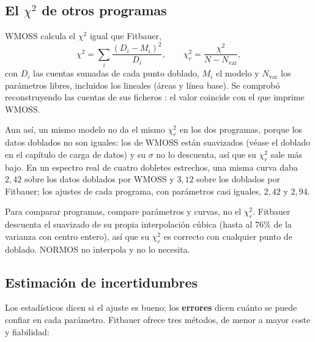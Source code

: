 \subsection{El \texorpdfstring{$\chi^2$}{chi2} de otros programas}
\label{sec:chi2-programas}

WMOSS calcula el $\chi^2$ igual que Fitbauer,
\[
  \chi^2 = \sum_i \frac{(D_i - M_i)^2}{D_i}, \qquad
  \chi^2_r = \frac{\chi^2}{N - N_\text{var}},
\]
con $D_i$ las cuentas sumadas de cada punto doblado, $M_i$ el modelo y
$N_\text{var}$ los parámetros libres, incluidos los lineales (áreas y línea
base). Se comprobó reconstruyendo las cuentas de sus ficheros : el valor
coincide con el que imprime WMOSS.

Aun así, un mismo modelo no da el mismo $\chi^2_r$ en los dos programas, porque
los datos doblados no son iguales: los de WMOSS están suavizados (véase el
doblado en el capítulo de carga de datos) y su $\sigma$ no lo descuenta, así que
su $\chi^2_r$ sale más bajo. En un espectro real de cuatro dobletes estrechos,
una misma curva daba $2{,}42$ sobre los datos doblados por WMOSS y $3{,}12$
sobre los doblados por Fitbauer; los ajustes de cada programa, con parámetros
casi iguales, $2{,}42$ y $2{,}94$.

\begin{nota}
Para comparar programas, compare parámetros y curvas, no el $\chi^2_r$. Fitbauer descuenta el suavizado de su propia interpolación cúbica (hasta al
$76\%$ de la varianza con centro entero), así que su $\chi^2_r$ es correcto con
cualquier punto de doblado. NORMOS no interpola y no lo necesita.
\end{nota}

\subsection{Estimación de incertidumbres}

Los estadísticos dicen si el ajuste es bueno; los \textbf{errores} dicen cuánto se
puede confiar en cada parámetro. Fitbauer ofrece tres métodos, de menor a mayor
coste y fiabilidad:

